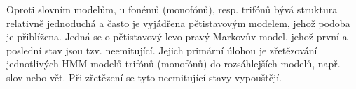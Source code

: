 

Oproti slovním modelům, u fonémů (monofónů), resp. trifónů bývá struktura relativně jednoduchá a často je vyjádřena pětistavovým modelem, jehož podoba je přiblížena.
Jedná se o pětistavový levo-pravý Markovův model, jehož první a poslední stav jsou tzv. neemitující. Jejich primární úlohou je zřetězování jednotlivých HMM modelů trifónů (monofónů) do rozsáhlejších modelů, např. slov nebo vět. Při zřetězení se tyto neemitující stavy vypouštějí.






